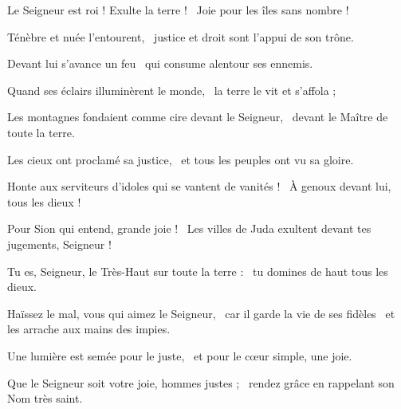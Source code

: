 \item Le Seigneur est roi ! Exulte la terre !~\psstar{} Joie pour les îles sans nombre !
\item Ténèbre et nuée l'entourent,~\psstar{} justice et droit sont l'appui de son trône.
\item Devant lui s'avance un feu~\psstar{} qui consume alentour ses ennemis.
\item Quand ses éclairs illuminèrent le monde,~\psstar{} la terre le vit et s'affola ;
\item Les montagnes fondaient comme cire devant le Seigneur,~\psstar{} devant le Maître de toute la terre.
\item Les cieux ont proclamé sa justice,~\psstar{} et tous les peuples ont vu sa gloire.
\item Honte aux serviteurs d'idoles qui se vantent de vanités !~\psstar{} À genoux devant lui, tous les dieux !
\item Pour Sion qui entend, grande joie !~\psstar{} Les villes de Juda exultent devant tes jugements, Seigneur !
\item Tu es, Seigneur, le Très-Haut sur toute la terre :~\psstar{} tu domines de haut tous les dieux.
\item Haïssez le mal, vous qui aimez le Seigneur,~\pscross{} car il garde la vie de ses fidèles~\psstar{} et les arrache aux mains des impies.
\item Une lumière est semée pour le juste,~\psstar{} et pour le cœur simple, une joie.
\item Que le Seigneur soit votre joie, hommes justes ;~\psstar{} rendez grâce en rappelant son Nom très saint.

